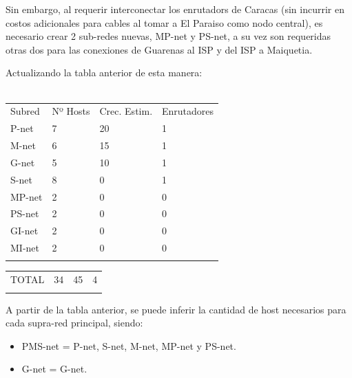 \documentclass[]{article}
\begin{document}
Sin embargo, al requerir interconectar los enrutadors de Caracas (sin
incurrir en costos adicionales para cables al tomar a El Paraiso como
nodo central), es necesario crear 2 sub-redes nuevas, MP-net y PS-net, a
su vez son requeridas otras dos para las conexiones de Guarenas al ISP y
del ISP a Maiquetia.

Actualizando la tabla anterior de esta manera:\\\\

\begin{longtable}[c]{@{}llll@{}}
\toprule\addlinespace
Subred & Nº Hosts & Crec. Estim. & Enrutadores
\\\addlinespace
\midrule\endhead
P-net & 7 & 20 & 1
\\\addlinespace
M-net & 6 & 15 & 1
\\\addlinespace
G-net & 5 & 10 & 1
\\\addlinespace
S-net & 8 & 0 & 1
\\\addlinespace
MP-net & 2 & 0 & 0
\\\addlinespace
PS-net & 2 & 0 & 0
\\\addlinespace
GI-net & 2 & 0 & 0
\\\addlinespace
MI-net & 2 & 0 & 0
\\\addlinespace
\bottomrule
\end{longtable}

\begin{longtable}[c]{@{}llll@{}}
\toprule\addlinespace
\begin{minipage}[t]{0.17\columnwidth}\raggedright
TOTAL
\end{minipage} & \begin{minipage}[t]{0.17\columnwidth}\raggedright
34
\end{minipage} & \begin{minipage}[t]{0.17\columnwidth}\raggedright
45
\end{minipage} & \begin{minipage}[t]{0.17\columnwidth}\raggedright
4
\end{minipage}
\\\addlinespace
\bottomrule
\end{longtable}

A partir de la tabla anterior, se puede inferir la cantidad de host
necesarios para cada supra-red principal, siendo:

\begin{itemize}
\itemsep1pt\parskip0pt
\item
  PMS-net = P-net, S-net, M-net, MP-net y PS-net.
\item
  G-net = G-net.
\end{itemize}
\end{document}
